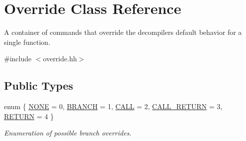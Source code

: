 \hypertarget{class_override}{}\section{Override Class Reference}
\label{class_override}


A container of commands that override the decompiler\textquotesingle{}s default behavior for a single function.  




{\ttfamily \#include $<$override.\+hh$>$}

\subsection*{Public Types}
\begin{DoxyCompactItemize}
\item 
enum \{ \newline
\mbox{\hyperlink{class_override_ad0215b6acd10d018a59e257fe4d39a06a77cee281d3ed540cfda0853197f23586}{N\+O\+NE}} = 0, 
\mbox{\hyperlink{class_override_ad0215b6acd10d018a59e257fe4d39a06a671a485ec597132fbd7b17e4a012785f}{B\+R\+A\+N\+CH}} = 1, 
\mbox{\hyperlink{class_override_ad0215b6acd10d018a59e257fe4d39a06a510fe02fbf062cd86c8152d14c5a6ef0}{C\+A\+LL}} = 2, 
\mbox{\hyperlink{class_override_ad0215b6acd10d018a59e257fe4d39a06a5a94fa28e25fe8babb186322b2918e4c}{C\+A\+L\+L\+\_\+\+R\+E\+T\+U\+RN}} = 3, 
\newline
\mbox{\hyperlink{class_override_ad0215b6acd10d018a59e257fe4d39a06a17d939b7a8f01dbb37e53d903dfe246e}{R\+E\+T\+U\+RN}} = 4
 \}
\begin{DoxyCompactList}\small\item\em Enumeration of possible branch overrides. \end{DoxyCompactList}\end{DoxyCompactItemize}
